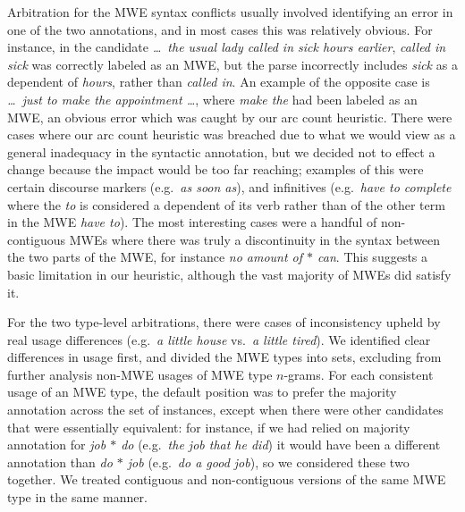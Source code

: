 \documentclass[output=paper
,modfonts
,nonflat]{langsci/langscibook}
\newcommand{\lex}[1]{\textit{#1}\xspace}
\newcommand{\ngram}[1][]{$n$-gram{#1}\xspace}
\newcommand{\gap}{$*$\xspace}
\begin{document}
Arbitration for the MWE syntax conflicts usually involved identifying an error in one of the two annotations, and in most cases this was relatively obvious. For instance, in the candidate \lex{\ldots~the usual lady called in sick hours earlier}, \lex{called in sick} was correctly labeled as an MWE, but the parse incorrectly includes \lex{sick} as a dependent of \lex{hours}, rather than \lex{called in}. An example of the opposite case is \lex{\ldots~just to make the appointment \ldots}, where  \lex{make the} had been labeled as an MWE, an obvious error which was caught by our arc count heuristic. There were cases where our arc count heuristic was breached due to what we would view as a general inadequacy in the syntactic annotation, but we decided not to effect a change because the impact would be too far reaching; examples of this were certain discourse markers (e.g.\ \lex{as soon as}), and infinitives (e.g.\ \lex{have to complete} where the \lex{to} is considered a dependent of its verb rather than of the other term in the MWE \lex{have to}). The most interesting cases were a handful of non-contiguous MWEs where there was truly a discontinuity in the syntax between the two parts of the MWE, for instance \lex{no amount of \gap can}. This suggests a basic limitation in our heuristic, although the vast majority of MWEs did satisfy it.

For the two type-level arbitrations, there were cases of inconsistency upheld by real usage differences (e.g.\ \lex{a little house} vs.\ \lex{a little tired}). We identified clear differences in usage first, and divided the MWE types into sets, excluding from further analysis non-MWE usages of MWE type \ngram[s]. For each consistent usage of an MWE type, the default position was to prefer the majority annotation across the set of instances, except when there were other candidates that were essentially equivalent: for instance, if we had relied on majority annotation for \lex{job \gap do} (e.g.\ \lex{the job that he did}) it would have been a different annotation than \lex{do \gap job} (e.g.\ \lex{do a good job}), so we considered these two together. We treated contiguous and non-contiguous versions of the same MWE type in the same manner.
\end{document}
